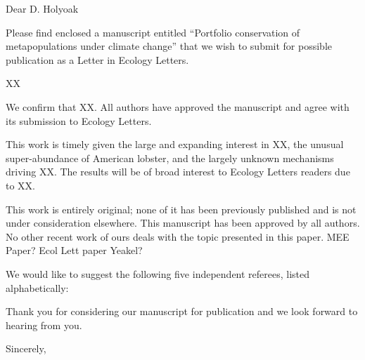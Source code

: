 \documentclass[letterpaper,12pt]{letter}
\begin{document}
\begin{letter}{}
\pagestyle{empty}
\opening{Dear D. Holyoak} %

Please find enclosed a manuscript entitled ``Portfolio conservation of metapopulations under climate change'' that we wish to submit for possible publication as a Letter in Ecology Letters.

XX

We confirm that XX. All authors have approved the manuscript and agree with
its submission to Ecology Letters.

This work is timely given the large and expanding interest in XX, the unusual super-abundance of American lobster, and the largely unknown mechanisms driving XX. The results will be of broad interest to Ecology Letters readers due to XX. 

This work is entirely original; none of it has been previously published and is not under consideration elsewhere. This manuscript has been approved by all authors. No other recent work of ours deals with the topic presented in this paper. MEE Paper? Ecol Lett paper Yeakel?

We would like to suggest the following five independent referees, listed alphabetically:

Thank you for considering our manuscript for publication and we look forward to hearing from you.

\vspace{14mm}
\closing{Sincerely,\\
}

\end{letter}
\end{document}
